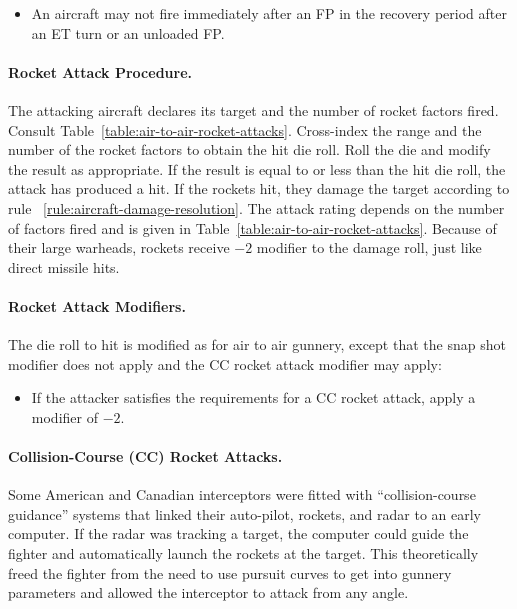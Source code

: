 \begin{advancedrules}
{\begin{itemize}
    \item An aircraft may not fire immediately after an FP in the recovery period after an ET turn or an unloaded FP.

\end{itemize}

\paragraph{Rocket Attack Procedure.} The attacking aircraft declares its target and the number of rocket factors fired. Consult Table~\ref{table:air-to-air-rocket-attacks}. Cross-index the range and the number of the rocket factors to obtain the hit die roll. Roll the die and modify the result as appropriate. If the result is equal to or less than the hit die roll, the attack has produced a hit. If the rockets hit, they damage the target according to rule ~\ref{rule:aircraft-damage-resolution}. The attack rating depends on the number of factors fired and is given in Table~\ref{table:air-to-air-rocket-attacks}. Because of their large warheads, rockets receive $-2$ modifier to the damage roll, just like direct missile hits.

\paragraph{Rocket Attack Modifiers.} 
The die roll to hit is modified as for air to air gunnery, except that the snap shot modifier does not apply and the CC rocket attack modifier may apply:

\begin{itemize}
    \item {} If the attacker satisfies the requirements for a CC rocket attack, apply a modifier of $-2$.
\end{itemize}

\paragraph{Collision-Course (CC) Rocket Attacks.} Some American and Canadian interceptors were fitted with “collision-course guidance” systems that linked their auto-pilot, rockets, and radar to an early computer. If the radar was tracking a target, the computer could guide the fighter and automatically launch the rockets at the target. This theoretically freed the fighter from the need to use pursuit curves to get into gunnery parameters and allowed the interceptor to attack from any angle.

}
\end{advancedrules}
